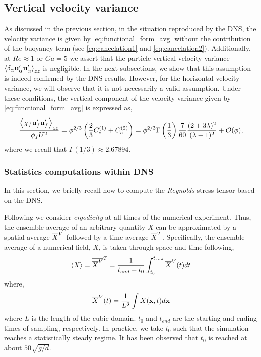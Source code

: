 \subsection{Vertical velocity variance}

As discussed in the previous section, in the situation reproduced by the DNS, the velocity variance is given by \ref{eq:functional_form_avg} without the contribution of the buoyancy term (see \eqref{eq:cancelation1} and \ref{eq:cancelation2}). 
Additionally, at $Re \approx 1$ or $Ga =5$ we assert that the particle vertical velocity variance $\left<\delta_\alpha \textbf{u}_\alpha'\textbf{u}_\alpha'\right>_{zz}$ is negligible. 
In the next subsections, we show that this assumption is indeed confirmed by the DNS results. 
However, for the horizontal velocity variance, we will observe that it is not necessarily a valid assumption. 
Under these conditions, the vertical component of the velocity variance given by \ref{eq:functional_form_avg} is expressed as, 
\begin{equation}
    \frac{\avg{\chi_f \textbf{u}_f'\textbf{u}_f'}_{zz}}{\phi_f U^2}
    = \phi^{2/3} \left(
        \frac{2}{3}C_e^{(1)}+ C_e^{(2)}
    \right)
    = 
    \phi^{2/3}\Gamma\left(\frac{1}{3}\right) \frac{7}{60}\frac{(2+3\lambda)^2 }{(\lambda+1)^2}
    + \mathcal{O}(\phi), 
    \label{eq:theoritical_simplified}
\end{equation}
where we recall that $\Gamma(1/3) \approx 2.67894$. 

\subsubsection{Statistics computations within DNS}

In this section, we briefly recall how to compute the \textit{Reynolds} stress tensor based on the DNS. 

Following \citet{du2022analysis} we consider \textit{ergodicity} at all times of the numerical experiment.
Thus, the ensemble average of an arbitrary quantity $X$ can be approximated by a spatial average $\overline{X}^V$ followed by a time average $\overline{X}^T$. 
Specifically, the ensemble average of a numerical field, $X$, is taken through space and time following,
\begin{equation}
    \left<X\right>
    = \overline{\overline{X}^V}^T
    = \frac{1}{ t_{end} - t_0}\int_{t_0}^{t_{end}} 
    \overline{X}^V(t) dt
\end{equation}
where, 
\begin{equation}
    \overline{X}^V(t)
    = \frac{1}{L^3}\int 
    X(\textbf{x},t) d\textbf{x}
\end{equation}
where $L$ is the length of the cubic domain.
$t_0$ and $t_{end}$ are the starting and ending times of sampling, respectively.
In practice, we take $t_0$ such that the simulation reaches a statistically steady regime.  
It has been observed that $t_0$ is reached at about $50 \sqrt{g/d}$. 


